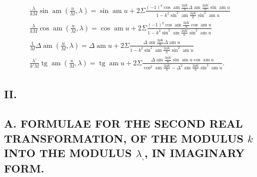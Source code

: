 \documentclass{article}
\begin{document}
\[
\begin{gathered}
\frac{\lambda}{kM}\sin\operatorname{am}\left(\frac{u}{M},\lambda\right)=\sin\operatorname{am}u+2\Sigma\frac{(-1)^{q}\cos\operatorname{am}\frac{2qK}{n}\Delta\operatorname{am}\frac{2qK}{n}\sin\operatorname{am}u}{1-k^{2}\sin^{2}\operatorname{am}\frac{2qK}{n}\sin^{2}\operatorname{am}u}\\[2.5ex]
\frac{\lambda}{kM}\cos\operatorname{am}\left(\frac{u}{M},\lambda\right)=\cos\operatorname{am}u+2\Sigma\frac{(-1)^{q}\cos\operatorname{am}\frac{2qK}{n}\cos\operatorname{am}u}{1-k^{2}\sin^{2}\operatorname{am}\frac{2qK}{n}\sin^{2}\operatorname{am}u}\\[2.5ex]
\frac{1}{M}\Delta\operatorname{am}\left(\frac{u}{M},\lambda\right)=\Delta\operatorname{am}u+2\Sigma\frac{\Delta\operatorname{am}\frac{2qK}{n}\Delta\operatorname{am}u}{1-k^{2}\sin^{2}\operatorname{am}\frac{2qK}{n}\sin^{2}\operatorname{am}u}\\[2.5ex]
\frac{\lambda'}{k'M}\operatorname{tg}\operatorname{am}\left(\frac{u}{M},\lambda\right)=\operatorname{tg}\operatorname{am}u+2\Sigma\frac{\Delta\operatorname{am}\frac{2qK}{n}\sin\operatorname{am}u\cos\operatorname{am}u}{\cos^{2}\operatorname{am}\frac{2qK}{n}-\Delta^{2}\operatorname{am}\frac{2qK}{n}\sin^{2}\operatorname{am}u}.
\end{gathered}
\]

\subsection*{II.}

\subsection*{A. FORMULAE FOR THE SECOND REAL TRANSFORMATION, OF THE MODULUS $k$ INTO THE MODULUS $\lambda_{,}$, IN IMAGINARY FORM.}
\end{document}
